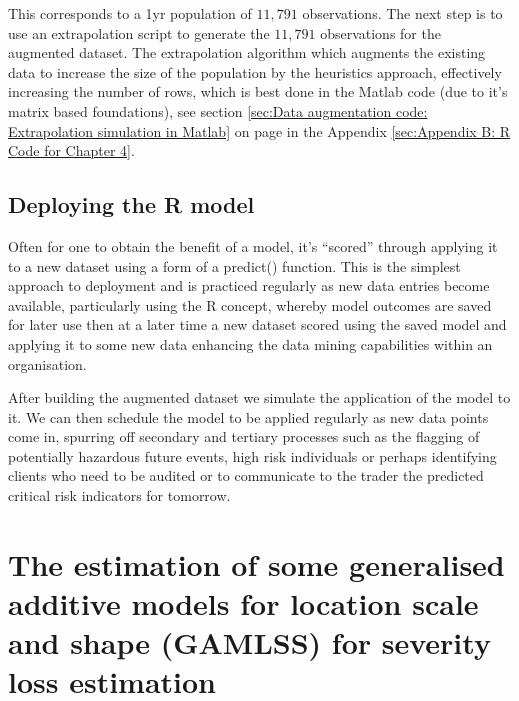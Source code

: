 \documentclass{DissertateUSU}
\begin{document}
This corresponds to a 1yr population of \(11,791\) observations. The
next step is to use an extrapolation script to generate the \(11,791\)
observations for the augmented dataset. The extrapolation algorithm
which augments the existing data to increase the size of the population
by the heuristics approach, effectively increasing the number of rows,
which is best done in the Matlab code (due to it's matrix based
foundations), see section
\ref{sec:Data augmentation code: Extrapolation simulation in Matlab} on
page
\pageref{sec:Data augmentation code: Extrapolation simulation in Matlab}in
the Appendix \ref{sec:Appendix B: R Code for Chapter 4}.

\subsection{Deploying the R model}
\label{ssec:Deploying and R model}

Often for one to obtain the benefit of a model, it's ``scored'' through
applying it to a new dataset using a form of a predict() function. This
is the simplest approach to deployment and is practiced regularly as new
data entries become available, particularly using the R concept, whereby
model outcomes are saved for later use then at a later time a new
dataset scored using the saved model and applying it to some new data
enhancing the data mining capabilities within an organisation. \medskip

After building the augmented dataset we simulate the application of the
model to it. We can then schedule the model to be applied regularly as
new data points come in, spurring off secondary and tertiary processes
such as the flagging of potentially hazardous future events, high risk
individuals or perhaps identifying clients who need to be audited or to
communicate to the trader the predicted critical risk indicators for
tomorrow.

\singlespacing

\doublespacing

\section{The estimation of some  generalised additive models for location scale and shape (GAMLSS) for severity loss estimation}
\label{sec:The estimation of some  generalised additive models for location scale and shape (GAMLSS) for severity loss estimation}
\end{document}
